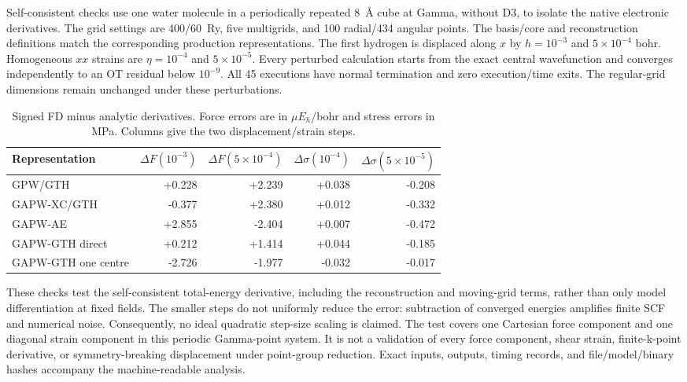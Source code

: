 Self-consistent checks use one water molecule in a periodically repeated 8~\AA{} cube at Gamma, without D3, to isolate the native electronic derivatives. The grid settings are 400/60~Ry, five multigrids, and 100 radial/434 angular points. The basis/core and reconstruction definitions match the corresponding production representations. The first hydrogen is displaced along $x$ by $h=10^{-3}$ and $5\times10^{-4}$ bohr. Homogeneous $xx$ strains are $\eta=10^{-4}$ and $5\times10^{-5}$. Every perturbed calculation starts from the exact central wavefunction and converges independently to an OT residual below $10^{-9}$. All 45 executions have normal termination and zero execution/time exits. The regular-grid dimensions remain unchanged under these perturbations.

\begin{table}[htbp]
\centering\small
\caption{Signed FD minus analytic derivatives. Force errors are in $\mu E_h$/bohr and stress errors in MPa. Columns give the two displacement/strain steps.}
\label{tab:derivatives}
\begin{tabular}{lrrrr}
\toprule
Representation & $\Delta F(10^{-3})$ & $\Delta F(5\times10^{-4})$ & $\Delta\sigma(10^{-4})$ & $\Delta\sigma(5\times10^{-5})$\\
\midrule
GPW/GTH & +0.228 & +2.239 & +0.038 & -0.208 \\
GAPW-XC/GTH & -0.377 & +2.380 & +0.012 & -0.332 \\
GAPW-AE & +2.855 & -2.404 & +0.007 & -0.472 \\
GAPW-GTH direct & +0.212 & +1.414 & +0.044 & -0.185 \\
GAPW-GTH one centre & -2.726 & -1.977 & -0.032 & -0.017 \\
\bottomrule
\end{tabular}
\end{table}

These checks test the self-consistent total-energy derivative, including the reconstruction and moving-grid terms, rather than only model differentiation at fixed fields. The smaller steps do not uniformly reduce the error: subtraction of converged energies amplifies finite SCF and numerical noise. Consequently, no ideal quadratic step-size scaling is claimed. The test covers one Cartesian force component and one diagonal strain component in this periodic Gamma-point system. It is not a validation of every force component, shear strain, finite-k-point derivative, or symmetry-breaking displacement under point-group reduction. Exact inputs, outputs, timing records, and file/model/binary hashes accompany the machine-readable analysis.
